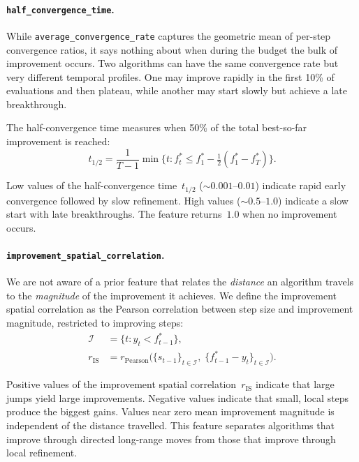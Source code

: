 \paragraph{\texttt{half\_convergence\_time}.}
\label{sec:features:novel:halftime}

While \texttt{average\_convergence\_rate} captures the geometric mean of
per-step convergence ratios, it says nothing about when during the budget the
bulk of improvement occurs.  Two algorithms can have the same convergence rate
but very different temporal profiles. One may improve rapidly in the first 10\% of evaluations and then plateau, while another may start slowly but achieve a late breakthrough.

The half-convergence time measures when 50\% of the total best-so-far
improvement is reached:
\begin{equation}
\label{eq:halftime}
  t_{1/2}
    = \frac{1}{T-1}\min\!\bigl\{t : f^*_t \le f^*_1
      - \tfrac{1}{2}(f^*_1 - f^*_T)\bigr\}.
\end{equation}

Low values of the half-convergence time~$t_{1/2}$
(${\sim}0.001\text{--}0.01$) indicate rapid early convergence
followed by slow refinement. High values (${\sim}0.5\text{--}1.0$) indicate
a slow start with late breakthroughs.  The feature returns~$1.0$ when no
improvement occurs.

\paragraph{\texttt{improvement\_spatial\_correlation}.}
\label{sec:features:novel:impspatial}

We are not aware of a prior feature that relates the \emph{distance} an algorithm travels to the \emph{magnitude} of the improvement it achieves.  We define the improvement
spatial correlation as the Pearson correlation between step size and
improvement magnitude, restricted to improving steps:
\begin{align}
\label{eq:impspatial}
  \mathcal{I} &= \{t : y_t < f^*_{t-1}\}, \nonumber \\
  r_{\mathrm{IS}}
    &= r_{\mathrm{Pearson}}\!\bigl(
         \{s_{t-1}\}_{t \in \mathcal{I}},\;
         \{f^*_{t-1} - y_t\}_{t \in \mathcal{I}}
       \bigr).
\end{align}

Positive values of the improvement spatial
correlation~$r_{\mathrm{IS}}$ indicate that large jumps yield large
improvements.
Negative values indicate that small, local steps produce the biggest gains.  Values near zero mean improvement
magnitude is independent of the distance travelled.  This feature separates
algorithms that improve through directed long-range moves from those that
improve through local refinement.

